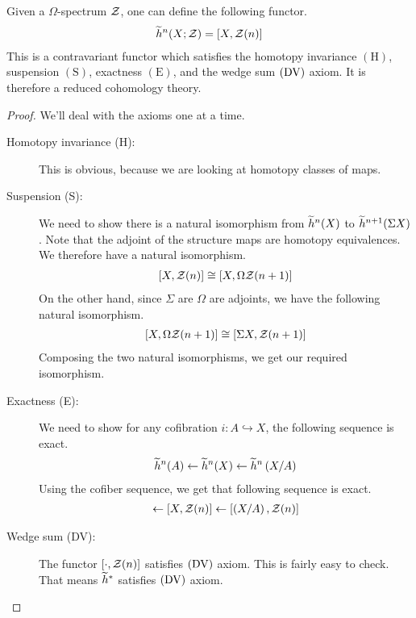 \begin{prop}
  Given a $\Omega$-spectrum $\mathcal{Z}$, one can define the following functor.
  \begin{align*}
    \widetilde{h}^n(X; \mathcal{Z}) = \left[X, \mathcal{Z}(n)\right]
  \end{align*}
  This is a contravariant functor which satisfies the homotopy invariance $(\mathrm{H})$, suspension
  $(\mathrm{S})$, exactness $(\mathrm{E})$, and the wedge sum $(\mathrm{DV})$ axiom. It is therefore a
  reduced cohomology theory.
\end{prop}

\begin{proof}
  We'll deal with the axioms one at a time.
  \begin{description}
  \item[Homotopy invariance (H):] This is obvious, because we are looking at homotopy classes of
    maps.
  \item[Suspension (S):] We need to show there is a natural isomorphism from $\widetilde{h}^n(X)$ to
    $\widetilde{h}^{n+1}(\Sigma X)$. Note that the adjoint of the structure maps are homotopy equivalences.
    We therefore have a natural isomorphism.
    \begin{align*}
      \left[ X, \mathcal{Z}(n) \right] \cong \left[ X, \Omega \mathcal{Z}(n+1) \right]
    \end{align*}
    On the other hand, since $\Sigma$ are $\Omega$ are adjoints, we have the following natural
    isomorphism.
    \begin{align*}
      \left[ X, \Omega \mathcal{Z}(n+1) \right] \cong \left[ \Sigma X, \mathcal{Z}(n+1) \right]
    \end{align*}
    Composing the two natural isomorphisms, we get our required isomorphism.
  \item[Exactness (E):] We need to show for any cofibration $i: A \hookrightarrow X$, the following
    sequence is exact.
    \begin{align*}
      \widetilde{h}^n(A) \leftarrow \widetilde{h}^n(X) \leftarrow \widetilde{h}^n\left( X/A \right)
    \end{align*}
    Using the cofiber sequence, we get that following sequence is exact.
    \begin{align*}
      [A, \calz(n)] \leftarrow [X, \calz(n)] \leftarrow \left[\left(X/A\right), \calz(n) \right]
    \end{align*}
  \item[Wedge sum (DV):] The functor $[\cdot, \mathcal{Z}(n)]$ satisfies $(\mathrm{DV})$ axiom. This is fairly
    easy to check. That means $\widetilde{h}^{\ast}$ satisfies $(\mathrm{DV})$ axiom.
  \end{description}
\end{proof}

